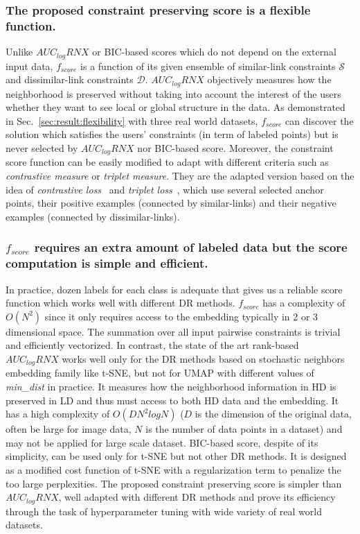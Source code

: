 \subsubsection*{The proposed constraint preserving score is a flexible function.}
Unlike $AUC_{log}RNX$ or BIC-based scores which do not depend on the external input data, $f_{score}$ is a function of its given ensemble of similar-link constraints $\mathcal{S}$ and dissimilar-link constraints $\mathcal{D}$.
$AUC_{log}RNX$ objectively measures how the neighborhood is preserved without taking into account the interest of the users whether they want to see local or global structure in the data.
As demonstrated in Sec.~\ref{sec:result:flexibility} with three real world datasets, $f_{score}$ can discover the solution which satisfies the users' constraints (in term of labeled points) but is never selected by $AUC_{log}RNX$ nor BIC-based score.
Moreover, the constraint score function can be easily modified to adapt with different criteria such as \emph{contrastive measure} or \emph{triplet measure}.
They are the adapted version based on the idea of \emph{contrastive loss}~\cite[Sec.3]{logeswaran2018efficient} and \emph{triplet loss}~\cite[Sec.3.1]{schroff2015facenet}, which use several selected anchor points, their positive examples (connected by similar-links) and their negative examples (connected by dissimilar-links).

\subsubsection*{$f_{score}$ requires an extra amount of labeled data but the score computation is simple and efficient.}
In practice, dozen labels for each class is adequate that gives us a reliable score function which works well with different DR methods.
$f_{score}$ has a complexity of $O(N^2)$ since it only requires access to the embedding typically in 2 or 3 dimensional space.
The summation over all input pairwise constraints is trivial and efficiently vectorized.
In contrast, the state of the art rank-based $AUC_{log}RNX$ works well only for the DR methods based on stochastic neighbors embedding family like t-SNE, but not for UMAP with different values of \emph{min\_dist} in practice.
It measures how the neighborhood information in HD is preserved in LD and thus must access to both HD data and the embedding.
It has a high complexity of $O(DN^2logN)$ ($D$ is the dimension of the original data, often be large for image data, $N$ is the number of data points in a dataset) and may not be applied for large scale dataset.
BIC-based score, despite of its simplicity, can be used only for t-SNE but not other DR methods.
It is designed as a modified cost function of t-SNE with a regularization term to penalize the too large perplexities.
The proposed constraint preserving score is simpler than $AUC_{log}RNX$, well adapted with different DR methods and prove its efficiency through the task of hyperparameter tuning with wide variety of real world datasets.

